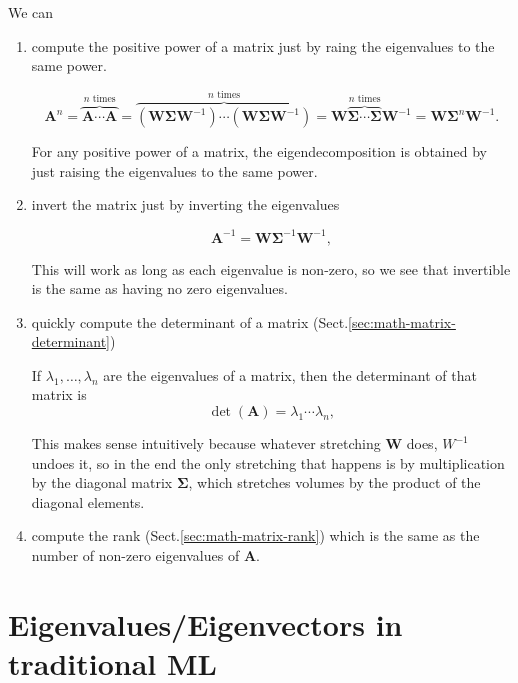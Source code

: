 We can 
\begin{enumerate}
  \item compute the positive power of a matrix just by raing the eigenvalues to the same power.
  
\begin{equation}
\mathbf{A}^n = \overbrace{\mathbf{A}\cdots \mathbf{A}}^{\text{$n$ times}} = \overbrace{(\mathbf{W}\boldsymbol{\Sigma} \mathbf{W}^{-1})\cdots(\mathbf{W}\boldsymbol{\Sigma} \mathbf{W}^{-1})}^{\text{$n$ times}} =  \mathbf{W}\overbrace{\boldsymbol{\Sigma}\cdots\boldsymbol{\Sigma}}^{\text{$n$ times}}\mathbf{W}^{-1} = \mathbf{W}\boldsymbol{\Sigma}^n \mathbf{W}^{-1}.
\end{equation}
  
  For any positive power of a matrix, the eigendecomposition is obtained by just raising the eigenvalues to the same power.

  \item invert the matrix just by inverting the eigenvalues

\begin{equation}
\mathbf{A}^{-1} = \mathbf{W}\boldsymbol{\Sigma}^{-1} \mathbf{W}^{-1},
\end{equation}

This will work as long as each eigenvalue is non-zero, so we see that invertible
is the same as having no zero eigenvalues.

  \item quickly compute the determinant of a matrix (Sect.\ref{sec:math-matrix-determinant}) 

If $\lambda_1, \ldots, \lambda_n$ 
are the eigenvalues of a matrix, then the determinant of that matrix is
\begin{equation}
\det(\mathbf{A}) = \lambda_1 \cdots \lambda_n,
\end{equation}

This makes sense intuitively because whatever stretching $\mathbf{W}$ does,
$W^{-1}$ undoes it, so in the end the only stretching that happens is by
multiplication by the diagonal matrix $\boldsymbol{\Sigma}$, which stretches
volumes by the product of the diagonal elements.

  \item compute the rank (Sect.\ref{sec:math-matrix-rank}) which is the same as
  the number of non-zero eigenvalues of $\mathbf{A}$.

\end{enumerate}

\section{Eigenvalues/Eigenvectors in traditional ML}


